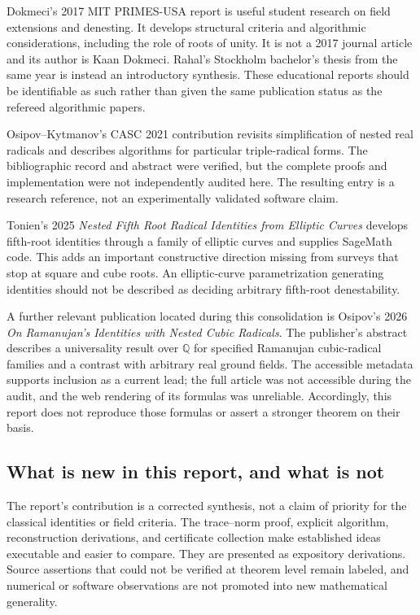 \documentclass[11pt,a4paper]{article}
\newcommand{\Q}{\mathbb{Q}}
\theoremstyle{definition}
\theoremstyle{remark}
\numberwithin{equation}{section}
\begin{document}
Dokmeci's 2017 MIT PRIMES-USA report is useful student research on field extensions and denesting. It develops structural criteria and algorithmic considerations, including the role of roots of unity. It is not a 2017 journal article and its author is Kaan Dokmeci. Rahal's Stockholm bachelor's thesis from the same year is instead an introductory synthesis. These educational reports should be identifiable as such rather than given the same publication status as the refereed algorithmic papers.\cite{dokmeci,rahal}

Osipov--Kytmanov's CASC 2021 contribution revisits simplification of nested real radicals and describes algorithms for particular triple-radical forms. The bibliographic record and abstract were verified, but the complete proofs and implementation were not independently audited here. The resulting entry is a research reference, not an experimentally validated software claim.\cite{osipovkytmanov}

Tonien's 2025 \emph{Nested Fifth Root Radical Identities from Elliptic Curves} develops fifth-root identities through a family of elliptic curves and supplies SageMath code. This adds an important constructive direction missing from surveys that stop at square and cube roots. An elliptic-curve parametrization generating identities should not be described as deciding arbitrary fifth-root denestability.\cite{tonien}

A further relevant publication located during this consolidation is Osipov's 2026 \emph{On Ramanujan's Identities with Nested Cubic Radicals}. The publisher's abstract describes a universality result over $\Q$ for specified Ramanujan cubic-radical families and a contrast with arbitrary real ground fields. The accessible metadata supports inclusion as a current lead; the full article was not accessible during the audit, and the web rendering of its formulas was unreliable. Accordingly, this report does not reproduce those formulas or assert a stronger theorem on their basis.\cite{osipov2026}

\subsection{What is new in this report, and what is not}

The report's contribution is a corrected synthesis, not a claim of priority for the classical identities or field criteria. The trace--norm proof, explicit algorithm, reconstruction derivations, and certificate collection make established ideas executable and easier to compare. They are presented as expository derivations. Source assertions that could not be verified at theorem level remain labeled, and numerical or software observations are not promoted into new mathematical generality.
\end{document}
